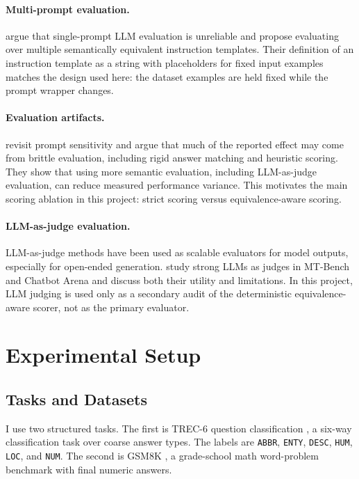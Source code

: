 \documentclass[11pt]{article}
\begin{document}
\paragraph{Multi-prompt evaluation.}
\citet{mizrahi2024state} argue that single-prompt LLM evaluation is unreliable and propose evaluating over multiple semantically equivalent instruction templates. Their definition of an instruction template as a string with placeholders for fixed input examples matches the design used here: the dataset examples are held fixed while the prompt wrapper changes.

\paragraph{Evaluation artifacts.}
\citet{hua2025flaw} revisit prompt sensitivity and argue that much of the reported effect may come from brittle evaluation, including rigid answer matching and heuristic scoring. They show that using more semantic evaluation, including LLM-as-judge evaluation, can reduce measured performance variance. This motivates the main scoring ablation in this project: strict scoring versus equivalence-aware scoring.

\paragraph{LLM-as-judge evaluation.}
LLM-as-judge methods have been used as scalable evaluators for model outputs, especially for open-ended generation. \citet{zheng2023judging} study strong LLMs as judges in MT-Bench and Chatbot Arena and discuss both their utility and limitations. In this project, LLM judging is used only as a secondary audit of the deterministic equivalence-aware scorer, not as the primary evaluator.

\section{Experimental Setup}

\subsection{Tasks and Datasets}

I use two structured tasks. The first is TREC-6 question classification \citep{li2002learning}, a six-way classification task over coarse answer types. The labels are \texttt{ABBR}, \texttt{ENTY}, \texttt{DESC}, \texttt{HUM}, \texttt{LOC}, and \texttt{NUM}. The second is GSM8K \citep{cobbe2021training}, a grade-school math word-problem benchmark with final numeric answers.
\end{document}
